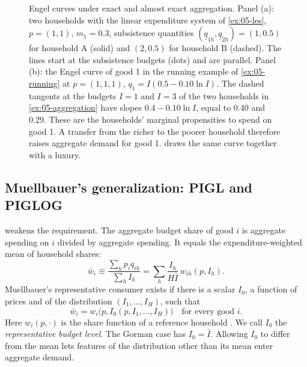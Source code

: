 \begin{figure}[htbp]
\caption{Engel curves under exact and almost exact aggregation. Panel (a): two households with the
linear expenditure system of \cref{ex:05-les}, $p = (1,1)$, $m_1 = 0.3$, subsistence quantities
$(\underline{q}_{1h}, \underline{q}_{2h}) = (1, 0.5)$ for household A (solid) and $(2, 0.5)$ for household
B (dashed). The lines start at the subsistence budgets (dots) and are parallel. Panel (b): the Engel curve
of good 1 in the running example of \cref{ex:05-running} at $p = (1,1,1)$, $q_1 = I(0.5 - 0.10\ln I)$. The
dashed tangents at the budgets $I = 1$ and $I = 3$ of the two households in \cref{ex:05-aggregation} have
slopes $0.4 - 0.10\ln I$, equal to 0.40 and 0.29. These are the households' marginal propensities to spend
on good 1. A transfer from the richer to the poorer household therefore raises aggregate demand for good
1.  draws the same curve together with a luxury.}
\label{fig:05-gorman-piglog}
\end{figure}

\subsection{Muellbauer's generalization: PIGL and PIGLOG}\label{sec:05-pigl}

\citet{Muellbauer1975,Muellbauer1976} weakens the requirement. The aggregate budget share of good $i$ is
aggregate spending on $i$ divided by aggregate spending. It equals the expenditure-weighted mean of
household shares:
\begin{equation}\label{eq:05-wbar}
  \bar w_i \equiv \frac{\sum_h p_i q_{ih}}{\sum_h I_h} = \sum_h \frac{I_h}{H\bar I}\, w_{ih}(p, I_h).
\end{equation}
Muellbauer's representative consumer exists if there is a scalar $I_0$, a function of prices and of the
distribution $(I_1, \dots, I_H)$, such that
\begin{equation}\label{eq:05-muellbauer}
  \bar w_i = w_i\bigl(p, I_0(p, I_1, \dots, I_H)\bigr) \quad \text{for every good } i.
\end{equation}
Here $w_i(p, \cdot)$ is the share function of a reference household
\citep[eq.~A1]{DeatonMuellbauer1980a}. We call $I_0$ the \emph{representative budget level}. The Gorman
case has $I_0 = \bar I$. Allowing $I_0$ to differ from the mean lets features of the distribution other
than its mean enter aggregate demand.

